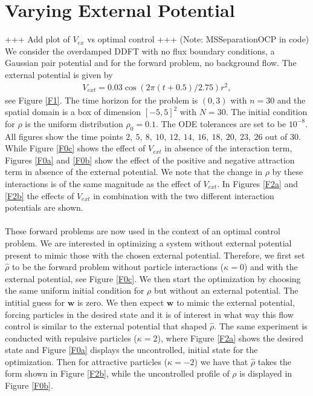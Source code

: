 \documentclass[11pt, a4paper]{article}
\theoremstyle{definition}
\newcommand{\w}{\mathbf{w}}
\newcommand{\hr}{\widehat \rho}
\begin{document}
\section{Varying External Potential} \label{sec:VaryExPotential}
+++ Add plot of $V_{ex}$ vs optimal control +++
(Note: MSSeparationOCP in code)
We consider the overdamped DDFT with no flux boundary conditions, a Gaussian pair potential and for the forward problem, no background flow. 
The external potential is given by
\begin{align*}
	V_{ext} = 0.03 \cos(2\pi (t + 0.5)/2.75)r^2,
\end{align*}
see Figure \ref{F1}. The time horizon for the problem is $(0,3)$ with $n = 30$ and the spatial domain is a box of dimension $[-5,5]^2$ with $N = 30$. The initial condition for $\rho$ is the uniform distribution $\rho_0 = 0.1$. The ODE tolerances are set to be $10^{-8}$. All figures show the time points $2,\  5,\ 8,\  10,\ 12,\ 14,\ 16,\ 18,\ 20,\ 23,\ 26$ out of $30$.
While Figure \ref{F0c} shows the effect of $V_{ext}$ in absence of the interaction term, Figures \ref{F0a} and \ref{F0b} show the effect of the positive and negative attraction term in absence of the external potential. We note that the change in $\rho$ by these interactions is of the same magnitude as the effect of $V_{ext}$. In Figures \ref{F2a} and \ref{F2b} the effects of $V_{ext}$ in combination with the two different interaction potentials are shown. 
\\
\\
These forward problems are now used in the context of an optimal control problem. We are interested in optimizing a system without external potential present to mimic those with the chosen external potential. Therefore, we first set $\hr$ to be the forward problem without particle interactions ($\kappa =0$) and with the external potential, see Figure \ref{F0c}. We then start the optimization by choosing the same uniform initial condition for $\rho$ but without an external potential. The intitial guess for $\w$ is zero. We then expect $\w$ to mimic the external potential, forcing particles in the desired state and it is of interest in what way this flow control is similar to the external potential that shaped $\hr$.
The same experiment is conducted with repulsive particles ($\kappa = 2$), where Figure \ref{F2a} shows the desired state and Figure \ref{F0a} displays the uncontrolled, initial state for the optimization. Then for attractive particles ($\kappa = -2$) we have that $\hr$ takes the form shown in Figure \ref{F2b}, while the uncontrolled profile of $\rho$ is displayed in Figure \ref{F0b}.\\
\end{document}
